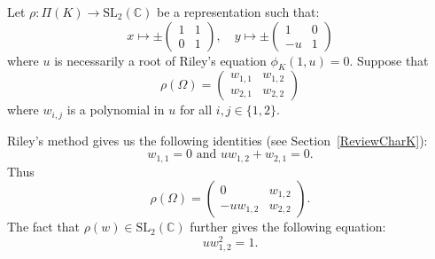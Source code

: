\documentclass[a4paper]{amsart}
\theoremstyle{plain}
\theoremstyle{definition}
\theoremstyle{remark}
\newcommand{\C}{{\mathbb C}}
\newcommand{\SL}{{\mathrm{SL}_2(\C)}}
\begin{document}
Let $\rho \colon \Pi(K) \to \SL$ be a representation such that: 
\[
x \mapsto 
\pm \left(
\begin{array}{cc}
1 &  1 \\
  0          &  1 
\end{array}
\right)
, \quad
y \mapsto 
\pm \left(
\begin{array}{cc}
 1 & 0 \\
  - u &  1 
\end{array}
\right)
\]
where $u$ is necessarily a root of Riley's equation $\phi_K(1,u)=0$. 
Suppose that 
\[
\rho(\Omega) = \left(\begin{array}{cc}w_{1,1} & w_{1,2} \\w_{2,1} & w_{2,2}\end{array}\right)
\]
where $w_{i,j}$ is a polynomial in $u$ for all $i, j \in \{1,2\}$.



Riley's method gives us the following identities (see Section~\ref{ReviewCharK}):
\[
w_{1,1} = 0 \text{ and } u w_{1,2} + w_{2,1} = 0. 
\]
Thus
\[
\rho(\Omega) = \left(\begin{array}{cc}0 & w_{1,2} \\ -u w_{1,2} & w_{2,2}\end{array}\right).
\]
The fact that $\rho(w) \in \SL$ further gives the following equation:
\begin{equation}\label{UW}
u w_{1,2}^2 = 1.
\end{equation}
\end{document}
